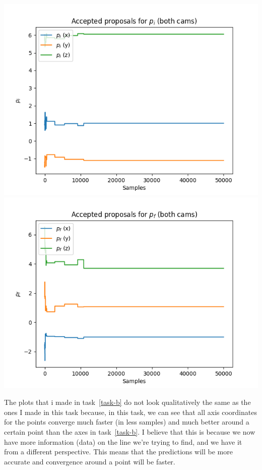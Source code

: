 \documentclass[10pt]{article}
\begin{document}
\begin{enumerate}
\includegraphics{figures/accepted_pi_both_cams.png}
\includegraphics{figures/accepted_pf_both_cams.png}

The plots that i made in task~\ref{task-b} do not look qualitatively the same as the ones I made in this task because, in this task, we can see that all axis coordinates for the points converge much faster (in less samples) and much better around a certain point than the axes in task~\ref{task-b}. I believe that this is because we now have more information (data) on the line we're trying to find, and we have it from a different perspective. This means that the predictions will be more accurate and convergence around a point will be faster.


\end{enumerate}
\end{document}
